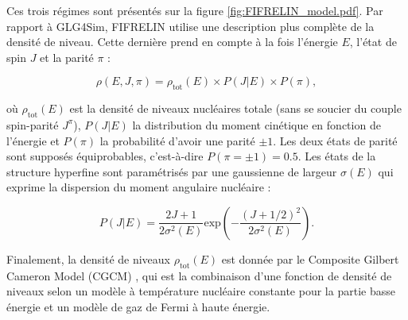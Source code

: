 Ces trois régimes sont présentés sur la figure \ref{fig:FIFRELIN_model.pdf}. Par rapport à GLG4Sim, FIFRELIN utilise une description plus complète de la densité de niveau. Cette dernière prend en compte à la fois l'énergie $E$, l'état de spin $J$ et la parité $\pi$ :

\begin{equation}
    \rho(E, J, \pi) = \rho_\textrm{tot}(E) \times P(J|E) \times P(\pi),
\end{equation}

\bigbreak

où $\rho_\textrm{tot}(E)$ est la densité de niveaux nucléaires totale (sans se soucier du couple spin-parité $J^\pi$), $P(J|E)$  la distribution du moment cinétique en fonction de l'énergie et $P(\pi)$ la probabilité d'avoir une parité $\pm 1$. Les deux états de parité sont supposés équiprobables, c'est-à-dire $P(\pi = \pm 1) = 0.5$. Les états de la structure hyperfine sont paramétrisés par une gaussienne de largeur $\sigma(E)$ qui exprime la dispersion du moment angulaire nucléaire \cite{Bethe:1936zza}:

\begin{equation}
    P(J|E) = \frac{2J + 1}{2 \sigma^2(E)} \textrm{exp}\left(- \frac{(J + 1/2)^2}{2 \sigma^2(E)}\right).
\end{equation}

\bigbreak

Finalement, la densité de niveaux $\rho_\textrm{tot}(E)$ est donnée par le \og Composite Gilbert Cameron Model \fg{} (CGCM) \cite{doi:10.1139/p65-139}, qui est la combinaison d'une fonction de densité de niveaux selon un modèle à température nucléaire constante pour la partie basse énergie et un modèle de gaz de Fermi à haute énergie.\\


